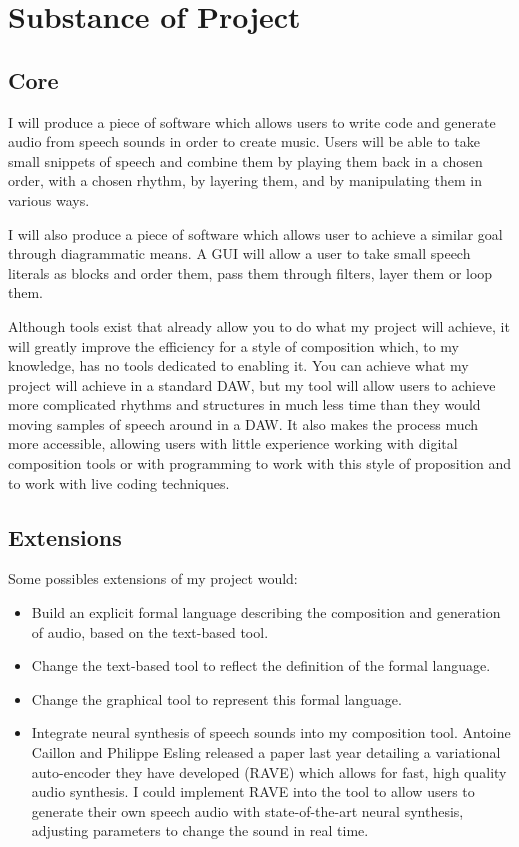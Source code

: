 \documentclass{article}
\begin{document}
\section*{Substance of Project}
\subsection*{Core}
I will produce a piece of software which allows users to write code and generate audio from speech sounds in order to create music. Users will be able to take small snippets of speech and combine them by playing them back in a chosen order, with a chosen rhythm, by layering them, and by manipulating them in various ways.

I will also produce a piece of software which allows user to achieve a similar goal through diagrammatic means. A GUI will allow a user to take small speech literals as blocks and order them, pass them through filters, layer them or loop them.

Although tools exist that already allow you to do what my project will achieve, it will greatly improve the efficiency for a style of composition which, to my knowledge, has no tools dedicated to enabling it. You can achieve what my project will achieve in a standard DAW, but my tool will allow users to achieve more complicated rhythms and structures in much less time than they would moving samples of speech around in a DAW. It also makes the process much more accessible, allowing users with little experience working with digital composition tools or with programming to work with this style of proposition and to work with live coding techniques.
\subsection*{Extensions}
Some possibles extensions of my project would:
\begin{itemize}
    \item Build an explicit formal language describing the composition and generation of audio, based on the text-based tool.
    \item Change the text-based tool to reflect the definition of the formal language.
    \item Change the graphical tool to represent this formal language.
    \item Integrate neural synthesis of speech sounds into my composition tool. Antoine Caillon and Philippe Esling released a paper last year detailing a variational auto-encoder they have developed (RAVE) which allows for fast, high quality audio synthesis. I could implement RAVE into the tool to allow users to generate their own speech audio with state-of-the-art neural synthesis, adjusting parameters to change the sound in real time.
\end{itemize}
\end{document}
